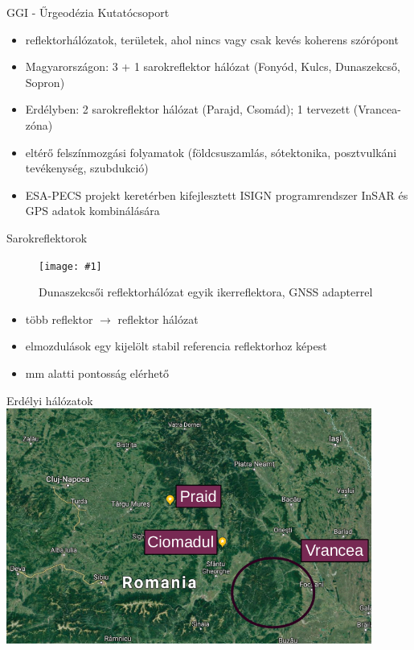 \documentclass{beamer}
\newcommand\figu[3]{
    \begin{figure}
        \texttt{[image: \#1]}
        \caption{#3}
    \end{figure}
}
\begin{document}
\begin{frame}{GGI - Űrgeodézia Kutatócsoport}

\begin{itemize}
    \item reflektorhálózatok, területek, ahol nincs vagy csak kevés
    koherens szórópont
    \item Magyarországon: 3 + 1 sarokreflektor hálózat (Fonyód, Kulcs, Dunaszekcső, Sopron)
    \item Erdélyben: 2 sarokreflektor hálózat (Parajd, Csomád);
    1 tervezett (Vrancea-zóna)
    \item eltérő felszínmozgási folyamatok (földcsuszamlás, sótektonika,
    posztvulkáni tevékenység, szubdukció)
    \item ESA-PECS projekt keretérben kifejlesztett ISIGN programrendszer
    InSAR és GPS adatok kombinálására
\end{itemize}

\end{frame}


\begin{frame}{Sarokreflektorok}

\begin{center}
    \figu{dszekcso_refl_3.jpg}{0.75}{Dunaszekcsői reflektorhálózat egyik
          ikerreflektora, GNSS adapterrel}
\end{center}

\begin{itemize}
    \item több reflektor $\rightarrow$ reflektor hálózat
    \item elmozdulások egy kijelölt stabil referencia reflektorhoz képest
    \item mm alatti pontosság elérhető
\end{itemize}

\end{frame}


\begin{frame}{Erdélyi hálózatok}
\includegraphics[width=0.9\textwidth]{praid_ciomadul.png}
\end{frame}
\end{document}

